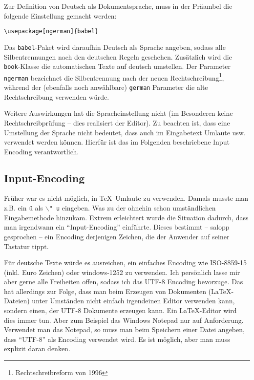  
Zur Definition von Deutsch als Dokumentsprache, muss in der Präambel die folgende Einstellung gemacht werden:
\begin{verbatim}
\usepackage[ngerman]{babel}
\end{verbatim}
Das \texttt{babel}-Paket wird daraufhin Deutsch als Sprache angeben, sodass alle Silbentrennungen nach den deutschen Regeln geschehen. Zusätzlich wird die \texttt{book}-Klasse die automatischen Texte auf deutsch umstellen. Der Parameter \texttt{ngerman} bezeichnet die Silbentrennung nach der neuen Rechtschreibung\footnote{Rechtschreibreform von 1996}, während der (ebenfalls noch anwählbare) \texttt{german} Parameter die alte Rechtschreibung verwenden würde. 

Weitere Auswirkungen hat die Spracheinstellung nicht (im Besonderen keine Rechtschreibprüfung -- dies realisiert der Editor). Zu beachten ist, dass eine Umstellung der Sprache nicht bedeutet, dass auch im Eingabetext Umlaute usw. verwendet werden können. Hierfür ist das im Folgenden beschriebene Input Encoding verantwortlich.

\subsection{Input-Encoding}

Früher war es nicht möglich, in \TeX\ Umlaute zu verwenden. Damals musste man z.B. ein ü als \texttt{$\backslash$"\,u} eingeben. Was zu der ohnehin schon umständlichen Eingabemethode hinzukam. Extrem erleichtert wurde die Situation dadurch, dass man irgendwann ein "`Input-Encoding"' einführte. Dieses bestimmt -- salopp gesprochen -- ein Encoding derjenigen Zeichen, die der Anwender auf seiner Tastatur tippt. 

Für deutsche Texte würde es ausreichen, ein einfaches Encoding wie ISO-8859-15 (inkl. Euro Zeichen) oder windows-1252 zu verwenden. Ich persönlich lasse mir aber gerne alle Freiheiten offen, sodass ich das UTF-8 Encoding bevorzuge. Das hat allerdings zur Folge, dass man beim Erzeugen von Dokumenten (\LaTeX-Dateien) unter Umständen nicht einfach irgendeinen Editor verwenden kann, sondern einen, der UTF-8 Dokumente erzeugen kann. Ein \LaTeX-Editor wird dies immer tun. Aber zum Beispiel das Windows Notepad nur auf Anforderung. Verwendet man das Notepad, so muss man beim Speichern einer Datei angeben, dass "`UTF-8"' als Encoding verwendet wird. Es ist möglich, aber man muss explizit daran denken.


